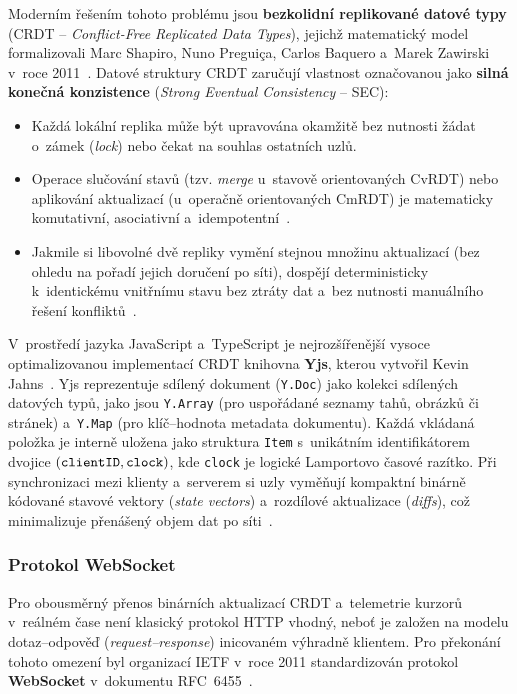 \documentclass[12pt, a4paper, oneside]{article}
\begin{document}
Moderním řešením tohoto problému jsou \textbf{bezkolidní replikované datové typy} (CRDT -- \textit{Conflict-Free Replicated Data Types}), jejichž matematický model formalizovali Marc Shapiro, Nuno Preguiça, Carlos Baquero a~Marek Zawirski v~roce 2011~\cite{shapiro2011crdt}. Datové struktury CRDT zaručují vlastnost označovanou jako \textbf{silná konečná konzistence} (\textit{Strong Eventual Consistency} -- SEC):
\begin{itemize}
    \item Každá lokální replika může být upravována okamžitě bez nutnosti žádat o~zámek (\textit{lock}) nebo čekat na souhlas ostatních uzlů.
    \item Operace slučování stavů (tzv. \textit{merge} u~stavově orientovaných CvRDT) nebo aplikování aktualizací (u~operačně orientovaných CmRDT) je matematicky komutativní, asociativní a~idempotentní~\cite{shapiro2011crdt}.
    \item Jakmile si libovolné dvě repliky vymění stejnou množinu aktualizací (bez ohledu na pořadí jejich doručení po síti), dospějí deterministicky k~identickému vnitřnímu stavu bez ztráty dat a~bez nutnosti manuálního řešení konfliktů~\cite{shapiro2011crdt}.
\end{itemize}

V~prostředí jazyka JavaScript a~TypeScript je nejrozšířenější vysoce optimalizovanou implementací CRDT knihovna \textbf{Yjs}, kterou vytvořil Kevin Jahns~\cite{jahns_yjs}. Yjs reprezentuje sdílený dokument (\texttt{Y.Doc}) jako kolekci sdílených datových typů, jako jsou \texttt{Y.Array} (pro uspořádané seznamy tahů, obrázků či stránek) a~\texttt{Y.Map} (pro klíč--hodnota metadata dokumentu). Každá vkládaná položka je interně uložena jako struktura \texttt{Item} s~unikátním identifikátorem dvojice $(\text{\texttt{clientID}}, \text{\texttt{clock}})$, kde \texttt{clock} je logické Lamportovo časové razítko. Při synchronizaci mezi klienty a~serverem si uzly vyměňují kompaktní binárně kódované stavové vektory (\textit{state vectors}) a~rozdílové aktualizace (\textit{diffs}), což minimalizuje přenášený objem dat po síti~\cite{jahns_yjs}.

\subsubsection{Protokol WebSocket}
\label{sec:teorie_websocket}

Pro obousměrný přenos binárních aktualizací CRDT a~telemetrie kurzorů v~reálném čase není klasický protokol HTTP vhodný, neboť je založen na modelu dotaz--odpověď (\textit{request--response}) inicovaném výhradně klientem. Pro překonání tohoto omezení byl organizací IETF v~roce 2011 standardizován protokol \textbf{WebSocket} v~dokumentu RFC~6455~\cite{rfc6455}.
\end{document}
